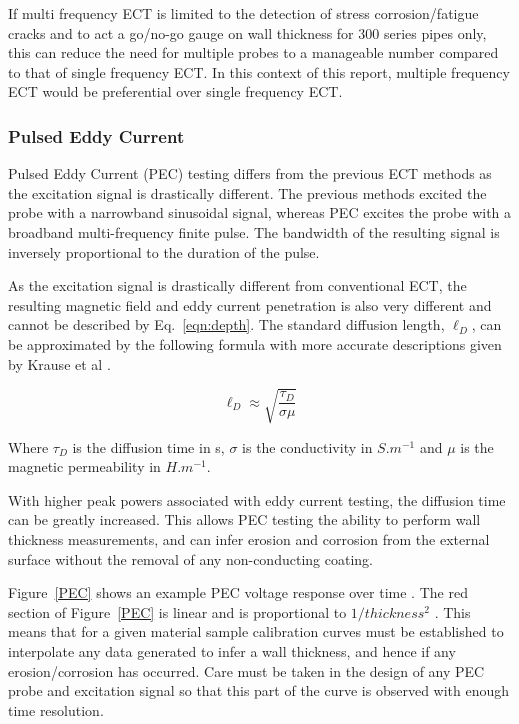 \documentclass[a4paper,twoside,11pt]{article}
\begin{document}
If multi frequency ECT is limited to the detection of stress corrosion/fatigue cracks and to act a go/no-go gauge on wall thickness for 300 series pipes only, this can reduce the need for multiple probes to a manageable number compared to that of single frequency ECT.
In this context of this report, multiple frequency ECT would be preferential over single frequency ECT.

\newpage
\subsubsection{Pulsed Eddy Current}

Pulsed Eddy Current (PEC) testing differs from the previous ECT methods as the excitation signal is drastically different. 
The previous methods excited the probe with a narrowband sinusoidal signal, whereas PEC excites the probe with a broadband multi-frequency finite pulse. 
The bandwidth of the resulting signal is inversely proportional to the duration of the pulse.

As the excitation signal is drastically different from conventional ECT, the resulting magnetic field and eddy current penetration is also very different and cannot be described by \mbox{Eq. \ref{eqn:depth}}. 
The standard diffusion length, $\ell_D$, can be approximated by the following formula \cite{ohanianApproachElectroMagneto1983} with more accurate descriptions given by Krause et al \cite{krausePULSEDEDDYCURRENT2010}.

\begin{equation} \label{eqn:length}
\ell_D \approx \sqrt{\frac{\tau_D}{\sigma \mu}}
\end{equation}

\noindent Where  $\tau_D$  is the diffusion time in s, $\sigma{}$ is the conductivity in  $S.m^{-1}$  and $\mu{}$ is the magnetic permeability in  $H.m^{-1}$.

With higher peak powers associated with eddy current testing, the diffusion time can be greatly increased. 
This allows PEC testing the ability to perform wall thickness measurements, and can infer erosion and corrosion from the external surface without the removal of any non-conducting coating.

\mbox{Figure \ref{PEC}} shows an example PEC voltage response over time \cite{fuFactorsAffectingSpatial}. 
The red section of \mbox{Figure \ref{PEC}} is linear and is proportional to $1/thickness^2$ \cite{xuAssessmentWallThinning2012}. 
This means that for a given material sample calibration curves must be established to interpolate any data generated to infer a wall thickness, and hence if any erosion/corrosion has occurred. 
Care must be taken in the design of any PEC probe and excitation signal so that this part of the curve is observed with enough time resolution.
\end{document}
